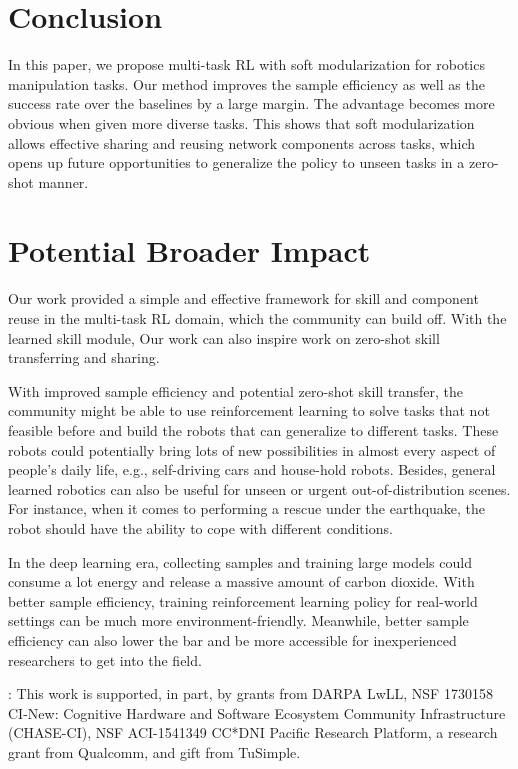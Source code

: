 \documentclass{article}
\begin{document}
\vspace{-0.1in}
\section{Conclusion}
\vspace{-0.1in}
In this paper, we propose multi-task RL with soft modularization for robotics manipulation tasks. Our method improves the sample efficiency as well as the success rate over the baselines by a large margin. The advantage becomes more obvious when given more diverse tasks. This shows that soft modularization allows effective sharing and reusing network components across tasks, which opens up future opportunities to generalize the policy to unseen tasks in a zero-shot manner. 

 
\vspace{-0.1in}
\section{Potential Broader Impact}
\vspace{-0.1in}
Our work provided a simple and effective framework for skill and component reuse in the multi-task RL domain, which the community can build off. With the learned skill module, Our work can also inspire work on zero-shot skill transferring and sharing. 

With improved sample efficiency and potential zero-shot skill transfer, the community might be able to use reinforcement learning to solve tasks that not feasible before and build the robots that can generalize to different tasks. 
These robots could potentially bring lots of new possibilities in almost every aspect of people's daily life, e.g., self-driving cars and house-hold robots.  Besides, general learned robotics can also be useful for unseen or urgent out-of-distribution scenes. For instance, when it comes to performing a rescue under the earthquake, the robot should have the ability to cope with different conditions. 

In the deep learning era, collecting samples and training large models could consume a lot energy and release a massive amount of carbon dioxide. With better sample efficiency, training reinforcement learning policy for real-world settings can be much more environment-friendly. Meanwhile, better sample efficiency can also lower the bar and be more accessible for inexperienced researchers to get into the field.

{: This work is supported, in part, by grants from DARPA LwLL, NSF 1730158 CI-New: Cognitive Hardware and Software Ecosystem Community Infrastructure (CHASE-CI), NSF ACI-1541349 CC*DNI Pacific Research Platform,  a research grant from Qualcomm, and gift from TuSimple.}

 




\end{document}
